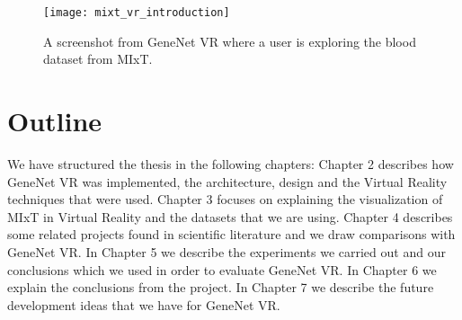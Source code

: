 \begin{figure}[h!]
    \newlength{\tempheight}
    \setlength{\tempheight}{15ex}
    \centering
    \texttt{[image: mixt\_vr\_introduction]}
    \caption{A screenshot from GeneNet VR where a user is exploring the blood dataset from MIxT.}
    \label{fig:bignet_intro}
\end{figure}


\section{Outline}

We have structured the thesis in the following chapters: Chapter 2 describes how GeneNet VR was implemented, the architecture, design and the Virtual Reality techniques that were used. Chapter 3 focuses on explaining the visualization of MIxT in Virtual Reality and the datasets that we are using. Chapter 4 describes some related projects found in scientific literature and we draw comparisons with GeneNet VR. In Chapter 5 we describe the experiments we carried out and our conclusions which we used in order to evaluate GeneNet VR. In Chapter 6 we explain the conclusions from the project. In Chapter 7 we describe the future development ideas that we have for GeneNet VR.
